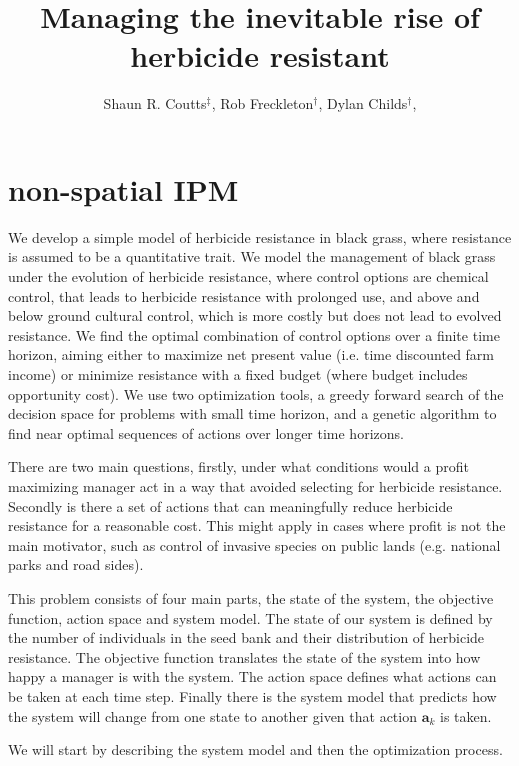 \documentclass[12pt, a4paper]{article}
\begin{document}
\title{Managing the inevitable rise of herbicide resistant}
\author{Shaun R. Coutts$^\ddag$, Rob Freckleton$^\dag$, Dylan Childs$^\dag$, }
\maketitle
\section{non-spatial IPM}
We develop a simple model of herbicide resistance in black grass, where resistance is assumed to be a quantitative trait. We model the management of black grass under the evolution of herbicide resistance, where control options are chemical control, that leads to herbicide resistance with prolonged use, and above and below ground cultural control, which is more costly but does not lead to evolved resistance. We find the optimal combination of control options over a finite time horizon, aiming either to maximize net present value (i.e. time discounted farm income) or minimize resistance with a fixed budget (where budget includes opportunity cost). We use two optimization tools, a greedy forward search of the decision space for problems with small time horizon, and a genetic algorithm to find near optimal sequences of actions over longer time horizons.

There are two main questions, firstly, under what conditions would a profit maximizing manager act in a way that avoided selecting for herbicide resistance. Secondly is there a set of actions that can meaningfully reduce herbicide resistance for a reasonable cost. This might apply in cases where profit is not the main motivator, such as control of invasive species on public lands (e.g. national parks and road sides).                  

This problem consists of four main parts, the state of the system, the objective function, action space and system model. The state of our system is defined by the number of individuals in the seed bank and their distribution of herbicide resistance. The objective function translates the state of the system into how happy a manager is with the system. The action space defines what actions can be taken at each time step. Finally there is the system model that predicts how the system will change from one state to another given that action $\textbf{a}_k$ is taken.        

We will start by describing the system model and then the optimization process.
\end{document}
